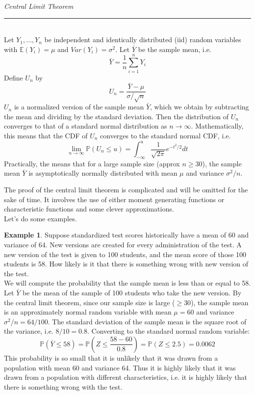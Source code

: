 \documentclass[12pt]{article}
\theoremstyle{definition}
\newtheorem*{example}{Example}
\theoremstyle{remark}
\def\P{{\mathbb P}}
\def\E{{\mathbb E}}
\begin{document}
\begin{framed}
\emph{Central Limit Theorem}\\
  \rule{\dimexpr{}\fboxrule}{.1pt} \\
Let $Y_1, \dots, Y_n$ be independent and identically distributed (iid) random variables with $\E(Y_i) = \mu$ and $Var(Y_i) = \sigma^2$. Let $\bar{Y}$ be the sample mean, i.e.
\[
\bar{Y} = \frac{1}{n}\sum_{i=1}^n Y_i
\]
Define $U_n$ by
\[
U_n = \frac{\bar{Y} - \mu}{\sigma/\sqrt{n}}
\]
$U_n$ is a normalized version of the sample mean $\bar{Y}$, which we obtain by subtracting the mean and dividing by the standard deviation. Then the distribution of $U_n$ converges to that of a standard normal distribution as $n \rightarrow \infty$. Mathematically, this means that the CDF of $U_n$ converges to the standard normal CDF, i.e.
\[
\lim_{n\rightarrow\infty} \P(U_n \leq u) = \int_{-\infty}^u \frac{1}{\sqrt{2\pi}}e^{-t^2/2} dt
\]
Practically, the means that for a large sample size (approx $n \geq 30$), the sample mean $\bar{Y}$ is asymptotically normally distributed with mean $\mu$ and variance $\sigma^2 / n$.
\end{framed}
The proof of the central limit theorem is complicated and will be omitted for the sake of time. It involves the use of either moment generating functions or characteristic functions and some clever approximations.\\

Let's do some examples.

\begin{example}
Suppose standardized test scores historically have a mean of 60 and variance of 64. New versions are created for every administration of the test. A new version of the test is given to 100 students, and the mean score of those 100 students is 58. How likely is it that there is something wrong with new version of the test.\\

We will compute the probability that the sample mean is less than or equal to 58. Let $\bar{Y}$ be the mean of the sample of 100 students who take the new version. By the central limit theorem, since our sample size is large ($\geq 30$), the sample mean is an approximately normal random variable with mean $\mu = 60$ and variance $\sigma^2 / n = 64 / 100$. The standard deviation of the sample mean is the square root of the variance, i.e. $8/10 = 0.8$. Converting to the standard normal random variable:
\[
\P(\bar{Y} \leq 58) = \P\left( Z \leq \frac{58 - 60}{0.8} \right) = \P(Z \leq 2.5) = 0.0062
\]
This probability is so small that it is unlikely that it was drawn from a population with mean 60 and variance 64. Thus it is highly likely that it was drawn from a population with different characteristics, i.e. it is highly likely that there is something wrong with the test.
\end{example}
\end{document}
